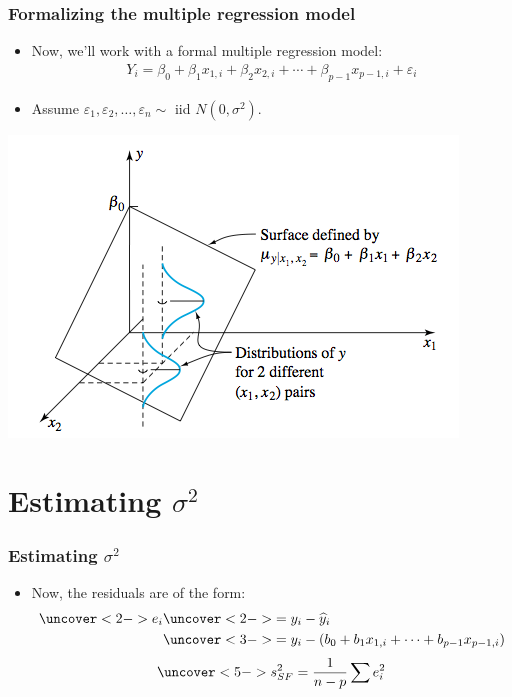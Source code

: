 \documentclass[handout]{beamer}\usepackage[]{graphicx}\usepackage[]{color}
\providecommand{\e}{\varepsilon}
\providecommand{\wh}[1]{\widehat{#1}}
\numberwithin{equation}{section}
\begin{document}
\begin{frame}
\frametitle{Formalizing the multiple regression model}
\begin{itemize}
\item Now, we'll work with a formal multiple regression model:
\pause \begin{align*}
Y_i = \beta_0 + \beta_1 x_{1, i} + \beta_2 x_{2, i} + \cdots + \beta_{p-1} x_{p-1, i} + \e_i
\end{align*}
\pause \item Assume $\e_1, \e_2, \ldots, \e_n \sim$ iid $N(0,\sigma^2)$.
\end{itemize}
\begin{center}
 \includegraphics{../../fig/mulregpict.png}
\end{center}
\end{frame}


\section{Estimating $\sigma^2$}

\begin{frame}
\frametitle{Estimating $\sigma^2$}
\begin{itemize}
\item Now, the residuals are of the form:
\begin{align*}
\uncover<2->{e_i} &\uncover<2->{= y_i - \wh{y}_i} \\
&\uncover<3->{= y_i - (b_0 + b_1 x_{1,i} + \cdots + b_{p-1} x_{p-1,i})}
\end{align*}
\begin{align*}
\uncover<5->{s^2_{SF} = \frac{1}{n-p} \sum e_i^2}
\end{align*}
\end{itemize}
\end{frame}
\end{document}
